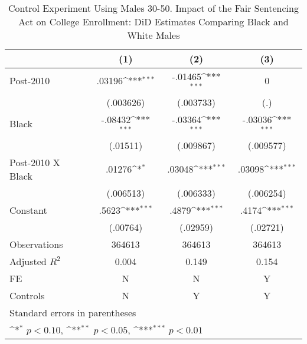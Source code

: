 \begin{table}[htbp]\centering
\def\sym#1{\ifmmode^{#1}\else\(^{#1}\)\fi}
\caption{Control Experiment Using Males 30-50. Impact of the Fair Sentencing Act on College Enrollment: DiD Estimates Comparing Black and White Males}
\begin{tabular}{l*{3}{c}}
\hline\hline
                    &\multicolumn{1}{c}{(1)}         &\multicolumn{1}{c}{(2)}         &\multicolumn{1}{c}{(3)}         \\
\hline
Post-2010           &      .03196\sym{***}&     -.01465\sym{***}&           0         \\
                    &   (.003626)         &   (.003733)         &         (.)         \\
[1em]
Black               &     -.08432\sym{***}&     -.03364\sym{***}&     -.03036\sym{***}\\
                    &    (.01511)         &   (.009867)         &   (.009577)         \\
[1em]
Post-2010 X Black   &      .01276\sym{*}  &      .03048\sym{***}&      .03098\sym{***}\\
                    &   (.006513)         &   (.006333)         &   (.006254)         \\
[1em]
Constant            &       .5623\sym{***}&       .4879\sym{***}&       .4174\sym{***}\\
                    &    (.00764)         &    (.02959)         &    (.02721)         \\
\hline
Observations        &      364613         &      364613         &      364613         \\
Adjusted \(R^{2}\)  &       0.004         &       0.149         &       0.154         \\
FE                  &           N         &           N         &           Y         \\
Controls            &           N         &           Y         &           Y         \\
\hline\hline
\multicolumn{4}{l}{\footnotesize Standard errors in parentheses}\\
\multicolumn{4}{l}{\footnotesize \sym{*} \(p<0.10\), \sym{**} \(p<0.05\), \sym{***} \(p<0.01\)}\\
\end{tabular}
\end{table}
